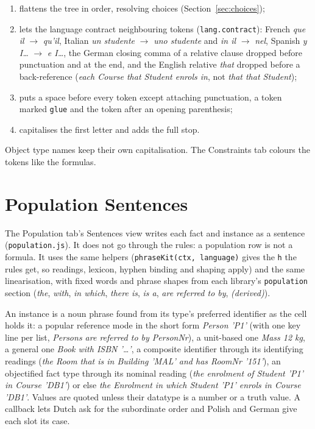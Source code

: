 \documentclass[11pt, a4paper]{article}
\newcommand{\code}[1]{\texttt{\color{codefg}#1}}
\begin{document}
\begin{enumerate}
  \item flattens the tree in order, resolving choices
        (Section~\ref{sec:choices});
  \item lets the language contract neighbouring tokens
        (\code{lang.contract}): French \textit{que il} $\to$ \textit{qu'il},
        Italian \textit{un studente} $\to$ \textit{uno studente} and
        \textit{in il} $\to$ \textit{nel}, Spanish \textit{y I\ldots} $\to$
        \textit{e I\ldots}, the German closing comma of a relative clause
        dropped before punctuation and at the end, and the English relative
        \textit{that} dropped before a back-reference (\textit{each Course
        that Student enrols in}, not \textit{that that Student});
  \item puts a space before every token except attaching punctuation, a
        token marked \code{glue} and the token after an opening parenthesis;
  \item capitalises the first letter and adds the full stop.
\end{enumerate}

Object type names keep their own capitalisation. The Constraints tab colours
the tokens like the formulas.

\section{Population Sentences}
\label{sec:population}

The Population tab's Sentences view writes each fact and instance as a
sentence (\code{population.js}). It does not go through the rules: a
population row is not a formula. It uses the same helpers
(\code{phraseKit(ctx, language)} gives the \code{h} the rules get, so
readings, lexicon, hyphen binding and shaping apply) and the same
linearisation, with fixed words and phrase shapes from each library's
\code{population} section (\textit{the}, \textit{with}, \textit{in which},
\textit{there is}, \textit{is a}, \textit{are referred to by},
\textit{(derived)}).

An instance is a noun phrase found from its type's preferred identifier as
the cell holds it: a popular reference mode in the short form
\textit{Person 'P1'} (with one key line per list, \textit{Persons are
referred to by PersonNr}), a unit-based one \textit{Mass 12 kg}, a general one
\textit{Book with ISBN '\ldots'}, a composite identifier through its
identifying readings (\textit{the Room that is in Building 'MAL' and has
RoomNr '151'}), an objectified fact type through its nominal reading
(\textit{the enrolment of Student 'P1' in Course 'DB1'}) or else
\textit{the Enrolment in which Student 'P1' enrols in Course 'DB1'}. Values
are quoted unless their datatype is a number or a truth value. A callback
lets Dutch ask for the subordinate order and Polish and German give each slot
its case.
\end{document}
